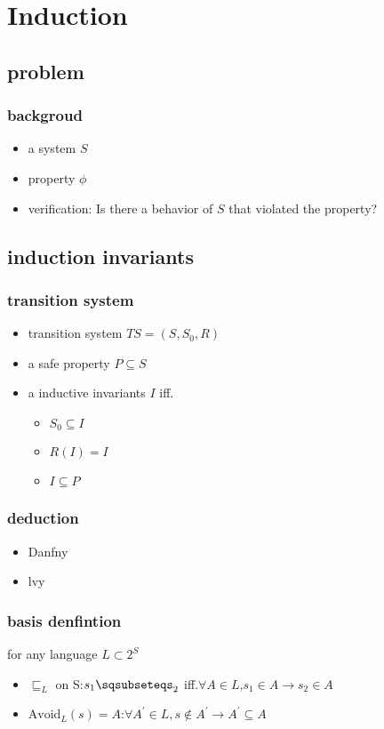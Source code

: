 \section{Induction}
\subsection{problem}
\begin{frame}
    \frametitle{backgroud}
    \begin{itemize}
        \item a system $S$
        \item property $\phi$
        \item verification: Is there a behavior of $S$ that violated the property?
    \end{itemize}
\end{frame}

\subsection{induction invariants}
\begin{frame}
    \frametitle{transition system}
    \begin{itemize}
        \item transition system $TS=(S,S_{0},R)$
        \item a safe property $P\subseteq S$
        \item a inductive invariants $I$ iff.
        \begin{itemize}
            \item $S_{0}\subseteq I$
            \item $R(I)=I$
            \item $I\subseteq P$
        \end{itemize}
    \end{itemize}
\end{frame}
\begin{frame}
    \frametitle{deduction}
    \begin{itemize}
        \item Danfny
        \item lvy
    \end{itemize}
\end{frame}
\begin{frame}
    \frametitle{basis denfintion}
    for any language $L\subset 2^{S}$
    \begin{itemize}
        \item $\sqsubseteq_{L}$ on S:$s_{1}\sqsubseteqs_{2}$ iff.$\forall A\in L$,$s_{1}\in A\rightarrow s_{2}\in A$
        \item $\text{Avoid}_{L}(s)=A$:$\forall A^{\prime}\in L, s\notin A^{\prime}\rightarrow A^{\prime}\subseteq A$
    \end{itemize}
\end{frame}